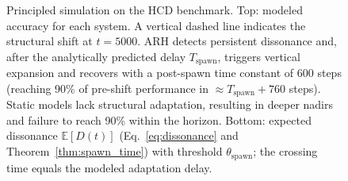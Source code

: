 \documentclass{article}
\numberwithin{figure}{section}
\numberwithin{table}{section}
\numberwithin{algorithm}{section}
\begin{document}
\begin{figure}[h]
\caption{Principled simulation on the HCD benchmark. Top: modeled accuracy for each system. A vertical dashed line indicates the structural shift at $t=5000$. ARH detects persistent dissonance and, after the analytically predicted delay $T_{\text{spawn}}$, triggers vertical expansion and recovers with a post-spawn time constant of 600 steps (reaching 90\% of pre-shift performance in $\approx T_{\text{spawn}} + 760$ steps). Static models lack structural adaptation, resulting in deeper nadirs and failure to reach 90\% within the horizon. Bottom: expected dissonance $\mathbb{E}[D(t)]$ (Eq.~\ref{eq:dissonance} and Theorem~\ref{thm:spawn_time}) with threshold $\theta_{\text{spawn}}$; the crossing time equals the modeled adaptation delay.}
\label{fig:performance_plot}
\end{figure}

\begin{table}[h]
\centering
\caption{Modeled performance on the HCD benchmark (principled simulation). Recovery speed is steps to 90\% of pre-shift accuracy within the 10k-step horizon; values reflect the modeled curves.}
\label{tab:results_hcd}
\end{table}
\end{document}
